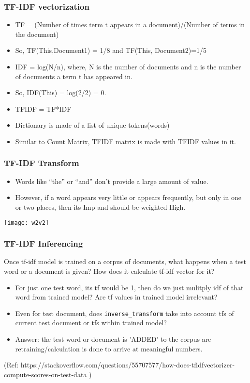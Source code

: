 \begin{frame}[fragile]\frametitle{TF-IDF vectorization}
\begin{itemize}
\item TF = (Number of times term t appears in a document)/(Number of terms in the document)
\item So, TF(This,Document1) = 1/8  and TF(This, Document2)=1/5
\item IDF = log(N/n), where, N is the number of documents and n is the number of documents a term t has appeared in.
\item So, IDF(This) = log(2/2) = 0.
\item TFIDF = TF*IDF
\item Dictionary is made of a list of unique tokens(words) 
\item Similar to Count Matrix, TFIDF matrix is made with TFIDF values in it.
\end{itemize}
\end{frame}


\begin{frame}[fragile]\frametitle{TF-IDF Transform}
  \begin{itemize}
	\item Words like ``the'' or ``and'' don't provide a large amount of value.
	\item  However, if a word appears very little or appears frequently, but only in one or two places, then its Imp and should be weighted High.
  \end{itemize}
  
\begin{center}
\texttt{[image: w2v2]}
\end{center}


\end{frame}

\begin{frame}[fragile]\frametitle{TF-IDF Inferencing}
Once tf-idf model is trained on a corpus of documents, what happens when a test word or a document is given? How does it calculate tf-idf vector for it?
\begin{itemize}
\item For just one test word, its tf would be 1, then do we just mulitply idf of that word from trained model? Are tf values in trained model irrelevant?
\item Even for test document, does \lstinline|inverse_transform| take into account tfs of current test document or tfs within trained model?
\item Answer: the test word or document is 'ADDED' to the corpus are retraining/calculation is done to arrive at meaningful numbers.
\end{itemize}

{\tiny (Ref: https://stackoverflow.com/questions/55707577/how-does-tfidfvectorizer-compute-scores-on-test-data )}
\end{frame}

